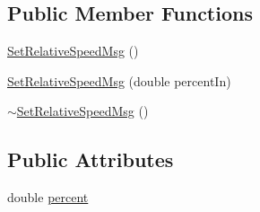 \subsection*{Public Member Functions}
\begin{DoxyCompactItemize}
\item 
\hyperlink{class_set_relative_speed_msg_a376660a86b56733712fb2e9342e71fc0}{SetRelativeSpeedMsg} ()
\item 
\hyperlink{class_set_relative_speed_msg_a91b11e98a48b8259fda4bdb0e1ce4d98}{SetRelativeSpeedMsg} (double percentIn)
\item 
\hyperlink{class_set_relative_speed_msg_a19b0217344cf7aee8b07f414815ebf32}{$\sim$SetRelativeSpeedMsg} ()
\end{DoxyCompactItemize}
\subsection*{Public Attributes}
\begin{DoxyCompactItemize}
\item 
double \hyperlink{class_set_relative_speed_msg_a2c6f3f77173fc32b66528f4d761f7283}{percent}
\end{DoxyCompactItemize}



